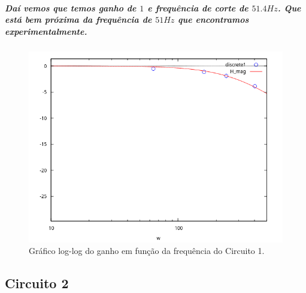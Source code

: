 \documentclass[12pt,twoside, a4paper, twocolumn]{article}
\begin{document}
\subparagraph*{Daí vemos que temos ganho de $1$ e frequência de corte de $51.4Hz$. Que está bem próxima da frequência de $51Hz$ que encontramos experimentalmente.}


\begin{figure}[h]
    \centering
    \includegraphics[width=1\columnwidth]{images/circuito1wx.png}
    \caption{Gráfico log-log do ganho em função da frequência do Circuito 1.}
\end{figure}


\pagebreak
\newpage


\subsection{Circuito 2}
\end{document}
